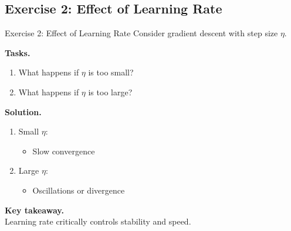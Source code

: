 \documentclass[aspectratio=169,11pt]{beamer}
\begin{document}
\subsection{Exercise 2: Effect of Learning Rate}
\begin{frame}[t,allowframebreaks]{Exercise 2: Effect of Learning Rate}
\small
Consider gradient descent with step size $\eta$.

\textbf{Tasks.}\\ \begin{enumerate}
    \item What happens if $\eta$ is too small?
    \item What happens if $\eta$ is too large?
\end{enumerate}

\textbf{Solution.}\\ \begin{enumerate}
\item Small $\eta$:
\begin{itemize}
    \item Slow convergence
\end{itemize}

\item Large $\eta$:
\begin{itemize}
    \item Oscillations or divergence
\end{itemize}
\end{enumerate}

\textbf{Key takeaway.}\\ Learning rate critically controls stability and speed.
\end{frame}
\end{document}
